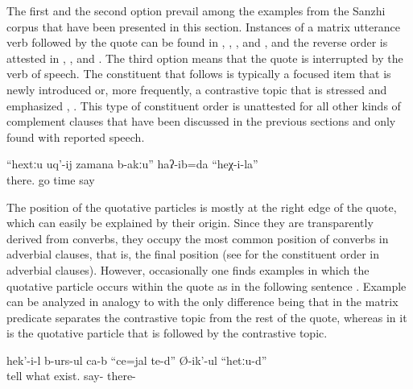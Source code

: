 The first and the second option prevail among the examples from the Sanzhi corpus that have been presented in this section. Instances of a matrix utterance verb followed by the quote can be found in , , , and , and the reverse order is attested in , , and . The third option means that the quote is interrupted by the verb of speech. The constituent that follows is typically a focused item that is newly introduced  or, more frequently, a contrastive topic that is stressed and emphasized , . This type of constituent order is unattested for all other kinds of complement clauses that have been discussed in the previous sections and only found with reported speech.
%
\begin{exe}
	\ex	\label{ex:I said, He does not have the time to go there}
	\gll	``hextːu	uq'-ij	zamana	b-akːu''	haʔ-ib=da 	``heχ-i-la''\\
		there.	go	time		say	\\
	\glt	{}
\end{exe}

The position of the quotative particles is mostly at the right edge of the quote, which can easily be explained by their origin. Since they are transparently derived from converbs, they occupy the most common position of converbs in adverbial clauses, that is, the final position (see  for the constituent order in adverbial clauses). However, occasionally one finds examples in which the quotative particle occurs within the quote as in the following sentence . Example  can be analyzed in analogy to  with the only difference being that in  the matrix predicate separates the contrastive topic from the rest of the quote, whereas in  it is the quotative particle that is followed by the contrastive topic.
%
\begin{exe}
	\ex	\label{ex:He is telling that there is something there}
	\gll	hek'-i-l	b-urs-ul	ca-b	``ce=jal	te-d''	Ø-ik'-ul	``hetːu-d''\\
			tell		what	exist.		say-	there-\\
	\glt	{}
\end{exe}


